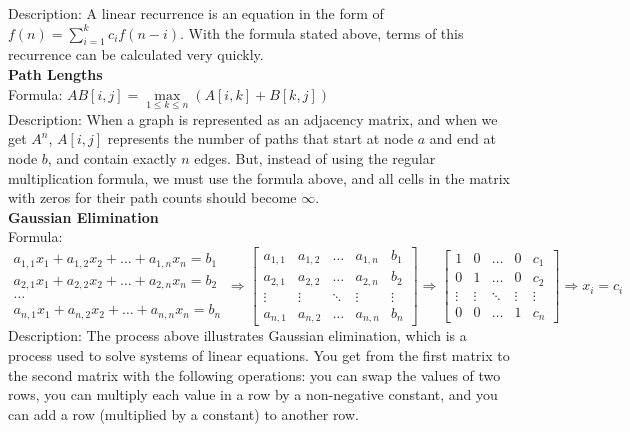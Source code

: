 \documentclass[12pt]{report}
\begin{document}
Description: A linear recurrence is an equation in the form of \(f(n)=\sum_{i=1}^{k}{c_if(n-i)}\). With the formula stated above, terms of this recurrence can be calculated very quickly.\\
\textbf{Path Lengths}\\
Formula: \(AB[i,j]=\underset{1\leq{k}\leq{n}}{\max}(A[i,k]+B[k,j])\)\\
Description: When a graph is represented as an adjacency matrix, and when we get \(A^n\), \(A[i,j]\) represents the number of paths that start at node \(a\) and end at node \(b\), and contain exactly \(n\) edges. But, instead of using the regular multiplication formula, we must use the formula above, and all cells in the matrix with zeros for their path counts should become \(\infty\).\\
\textbf{Gaussian Elimination}\\
Formula:\(\begin{matrix}a_{1,1}x_1+a_{1,2}x_2+\dots+a_{1,n}x_n=b_1\\a_{2,1}x_1+a_{2,2}x_2+\dots+a_{2,n}x_n=b_2\\\dots\\a_{n,1}x_1+a_{n,2}x_2+\dots+a_{n,n}x_n=b_n\end{matrix}\Rightarrow\begin{bmatrix}a_{1,1}&a_{1,2}&\dots&a_{1,n}&b_1\\a_{2,1}&a_{2,2}&\dots&a_{2,n}&b_2\\\vdots&\vdots&\ddots&\vdots&\vdots\\a_{n,1}&a_{n,2}&\dots&a_{n,n}&b_n\end{bmatrix}\Rightarrow\begin{bmatrix}1&0&\dots&0&c_1\\0&1&\dots&0&c_2\\\vdots&\vdots&\ddots&\vdots&\vdots\\0&0&\dots&1&c_n\end{bmatrix}\Rightarrow{x_i=c_i}\)\\
Description: The process above illustrates Gaussian elimination, which is a process used to solve systems of linear equations. You get from the first matrix to the second matrix with the following operations: you can swap the values of two rows, you can multiply each value in a row by a non-negative constant, and you can add a row (multiplied by a constant) to another row.\\
\end{document}
